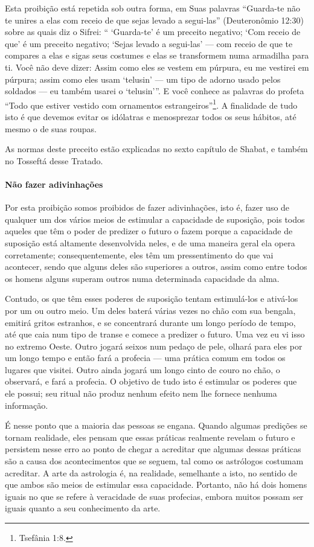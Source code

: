 Esta proibição está repetida sob outra forma, em Suas palavras
``Guarda-te não te unires a elas com receio de que sejas levado a
segui-las'' (Deuteronômio 12:30) sobre as quais diz o Sifrei: ``
`Guarda-te' é um preceito negativo; `Com receio de que' é um preceito
negativo; `Sejas levado a segui-las' --- com receio de que te compares a
elas e sigas seus costumes e elas se transformem numa armadilha para ti.
Você não deve dizer: Assim como eles se vestem em púrpura, eu me
vestirei em púrpura; assim como eles usam `telusin' --- um tipo de
adorno usado pelos soldados --- eu também usarei o `telusin'''. E você
conhece as palavras do profeta ``Todo que estiver vestido com ornamentos
estrangeiros''\footnote{Tsefânia 1:8.}. A finalidade de tudo isto é que
devemos evitar os idólatras e menosprezar todos os seus hábitos, até
mesmo o de suas roupas.

As normas deste preceito estão explicadas no sexto capítulo de Shabat, e
também no Tosseftá desse Tratado.

\paragraph{Não fazer adivinhações}

Por esta proibição somos proibidos de fazer adivinhações, isto é, fazer
uso de qualquer um dos vários meios de estimular a capacidade de
suposição, pois todos aqueles que têm o poder de predizer o futuro o
fazem porque a capacidade de suposição está altamente desenvolvida
neles, e de uma maneira geral ela opera corretamente; consequentemente,
eles têm um pressentimento do que vai acontecer, sendo que alguns deles
são superiores a outros, assim como entre todos os homens alguns superam
outros numa determinada capacidade da alma.

Contudo, os que têm esses poderes de suposição tentam estimulá-los e
ativá-los por um ou outro meio. Um deles baterá várias vezes no chão com
sua bengala, emitirá gritos estranhos, e se concentrará durante um longo
período de tempo, até que caia num tipo de transe e comece a predizer o
futuro. Uma vez eu vi isso no extremo Oeste. Outro jogará seixos num
pedaço de pele, olhará para eles por um longo tempo e então fará a
profecia --- uma prática comum em todos os lugares que visitei. Outro
ainda jogará um longo cinto de couro no chão, o observará, e fará a
profecia. O objetivo de tudo isto é estimular os poderes que ele
possui; seu ritual não produz nenhum efeito nem lhe fornece nenhuma
informação.

É nesse ponto que a maioria das pessoas se engana. Quando algumas
predições se tornam realidade, eles pensam que essas práticas realmente
revelam o futuro e persistem nesse erro ao ponto de chegar a acreditar
que algumas dessas práticas são a causa dos acontecimentos que se
seguem, tal como os astrólogos costumam acreditar. A arte da astrologia
é, na realidade, semelhante a isto, no sentido de que ambos são meios de
estimular essa capacidade. Portanto, não há dois homens iguais no que se refere à veracidade de suas
profecias, embora muitos possam ser iguais quanto a seu conhecimento da
arte.

